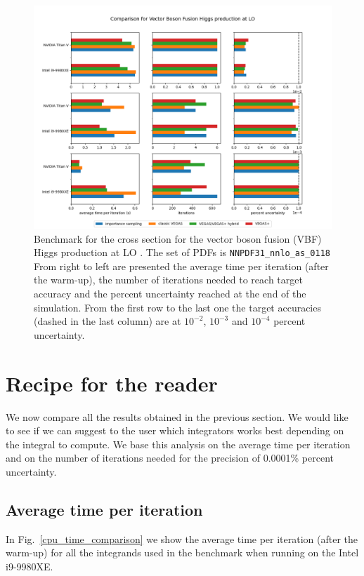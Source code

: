 \documentclass[../main/main.tex]{subfiles}
\begin{document}
\begin{figure}[h]
	\centering
	\includegraphics[width=\textwidth]{../images/higgs_correct.png}
	\caption{Benchmark  for the cross section for the vector boson fusion (VBF) Higgs production at LO \cite{Brucherseifer_2014}. The set of PDFs is \texttt{NNPDF31\_nnlo\_as\_0118} From right to left are presented the average time per iteration (after the warm-up), the number of iterations needed to reach target accuracy and the percent uncertainty reached at the end of the simulation. From the first row to the last one the target accuracies (dashed in the last column) are at $10^{-2}$, $10^{-3}$ and $10^{-4}$ percent uncertainty.}
	\label{higgs_plot}
\end{figure}

\section{Recipe for the reader}
We now compare all the results obtained in the previous section. We would like to see if we can suggest to the user which integrators works best depending on the integral to compute. We base this analysis on the average time per iteration and on the number of iterations needed for the precision of 0.0001\% percent uncertainty.

\subsection{Average time per iteration}
In Fig.~\ref{cpu_time_comparison} we show the average time per iteration (after the warm-up) for all the integrands used in the benchmark when running on the Intel i9-9980XE.
\end{document}

